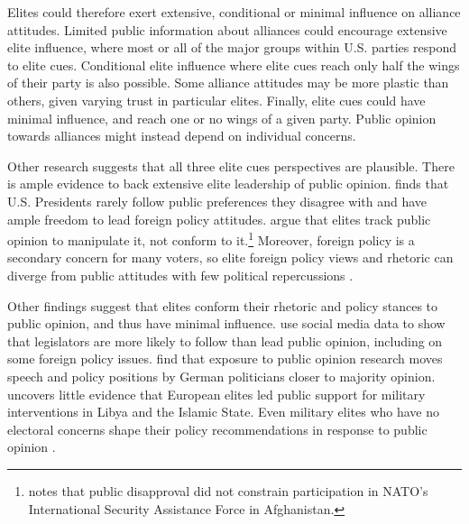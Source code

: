 \documentclass[12pt]{article}
\begin{document}
Elites could therefore exert extensive, conditional or minimal influence on alliance attitudes. 
Limited public information about alliances could encourage extensive elite influence, where most or all of the major groups within U.S. parties respond to elite cues. 
Conditional elite influence where elite cues reach only half the wings of their party is also possible. 
Some alliance attitudes may be more plastic than others, given varying trust in particular elites. 
Finally, elite cues could have minimal influence, and reach one or no wings of a given party.
Public opinion towards alliances might instead depend on individual concerns.


Other research suggests that all three elite cues perspectives are plausible. 
There is ample evidence to back extensive elite leadership of public opinion. 
\citet{Canes-Wrone2006} finds that U.S. Presidents rarely follow public preferences they disagree with and have ample freedom to lead foreign policy attitudes. 
\citet{JacobsShapiro2000} argue that elites track public opinion to manipulate it, not conform to it.\footnote{\citet{Kreps2010} notes that public disapproval did not constrain participation in NATO's International Security Assistance Force in Afghanistan.}
Moreover, foreign policy is a secondary concern for many voters, so elite foreign policy views and rhetoric can diverge from public attitudes with few political repercussions \citep{BusbyMonten2012}. 


Other findings suggest that elites conform their rhetoric and policy stances to public opinion, and thus have minimal influence. 
\citet{Barberaetal2019} use social media data to show that legislators are more likely to follow than lead public opinion, including on some foreign policy issues. 
\citet{HagerHilbig2020} find that exposure to public opinion research moves speech and policy positions by German politicians closer to majority opinion. 
\citet{Haesebrouck2019} uncovers little evidence that European elites led public support for military interventions in Libya and the Islamic State. 
Even military elites who have no electoral concerns shape their policy recommendations in response to public opinion \citep{LinGreenberg2021}. 
\end{document}
